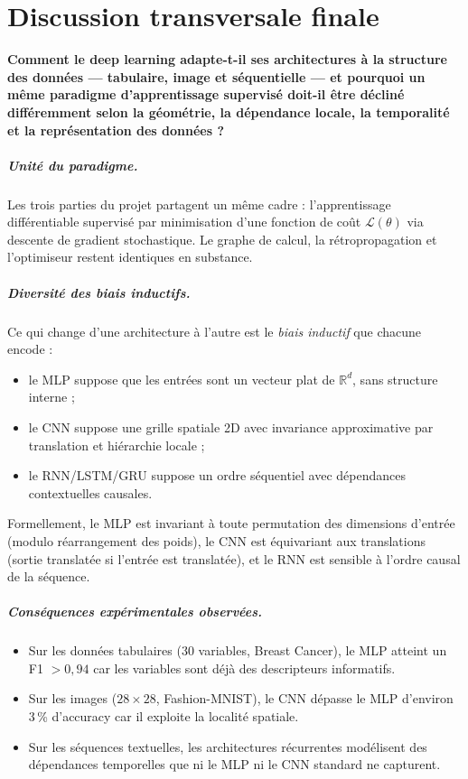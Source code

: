 \chapter{Discussion transversale finale}

\textbf{Comment le deep learning adapte-t-il ses architectures à la structure
des données --- tabulaire, image et séquentielle --- et pourquoi un même
paradigme d'apprentissage supervisé doit-il être décliné différemment selon la
géométrie, la dépendance locale, la temporalité et la représentation des
données ?}

\paragraph{Unité du paradigme.}
Les trois parties du projet partagent un même cadre : l'apprentissage
différentiable supervisé par minimisation d'une fonction de coût
$\mathcal{L}(\theta)$ via descente de gradient stochastique. Le graphe de
calcul, la rétropropagation et l'optimiseur restent identiques en substance.

\paragraph{Diversité des biais inductifs.}
Ce qui change d'une architecture à l'autre est le \emph{biais inductif} que
chacune encode :
\begin{itemize}
    \item le MLP suppose que les entrées sont un vecteur plat de
          $\mathbb{R}^d$, sans structure interne ;
    \item le CNN suppose une grille spatiale 2D avec invariance approximative
          par translation et hiérarchie locale ;
    \item le RNN/LSTM/GRU suppose un ordre séquentiel avec dépendances
          contextuelles causales.
\end{itemize}
Formellement, le MLP est invariant à toute permutation des dimensions d'entrée
(modulo réarrangement des poids), le CNN est équivariant aux translations
(sortie translatée si l'entrée est translatée), et le RNN est sensible à
l'ordre causal de la séquence.

\paragraph{Conséquences expérimentales observées.}
\begin{itemize}
    \item Sur les données tabulaires (30 variables, Breast Cancer), le MLP
          atteint un F1 $> 0{,}94$ car les variables sont déjà des descripteurs
          informatifs.
    \item Sur les images ($28 \times 28$, Fashion-MNIST), le CNN dépasse le
          MLP d'environ 3\,\% d'accuracy car il exploite la localité
          spatiale.
    \item Sur les séquences textuelles, les architectures récurrentes
          modélisent des dépendances temporelles que ni le MLP ni le CNN
          standard ne capturent.
\end{itemize}

